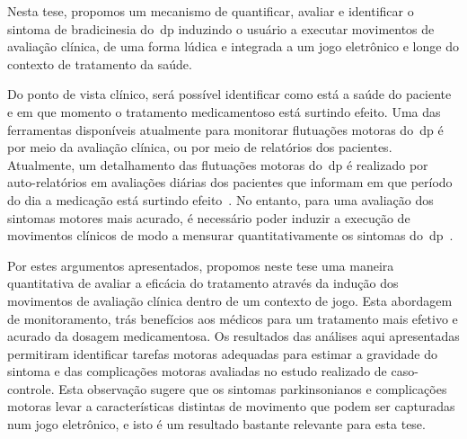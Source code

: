 Nesta tese, propomos um mecanismo de quantificar, avaliar e identificar o sintoma de bradicinesia do~\ac{dp} induzindo o usuário a executar movimentos de avaliação clínica, de uma forma lúdica e integrada a um jogo eletrônico e longe do contexto de tratamento da saúde.

Do ponto de vista clínico, será possível identificar como está a saúde do paciente e em que momento o tratamento medicamentoso está surtindo efeito. Uma das ferramentas disponíveis atualmente para monitorar flutuações motoras do~\ac{dp} é por meio da avaliação clínica, ou por meio de relatórios dos pacientes. Atualmente, um detalhamento das flutuações motoras do~\ac{dp} é realizado por auto-relatórios em avaliações diárias dos pacientes que informam em que período do dia a medicação está surtindo efeito~\cite{reviewassesenspark2015}. No entanto, para uma avaliação dos sintomas motores mais acurado, é necessário poder induzir a execução de movimentos clínicos de modo a mensurar quantitativamente os sintomas do~\ac{dp}~\cite{wiiassesspark2016}.

Por estes argumentos apresentados, propomos neste tese uma maneira quantitativa de avaliar a eficácia do tratamento através da indução dos movimentos de avaliação clínica dentro de um contexto de jogo. Esta abordagem de monitoramento, trás benefícios aos médicos para um tratamento mais efetivo e acurado da dosagem medicamentosa. Os resultados das análises aqui apresentadas permitiram identificar tarefas motoras adequadas para estimar a gravidade do sintoma e das complicações motoras avaliadas no estudo realizado de caso-controle. Esta observação sugere que os sintomas parkinsonianos e complicações motoras levar a características distintas de movimento que podem ser capturadas num jogo eletrônico, e isto é um resultado bastante relevante para esta tese.


